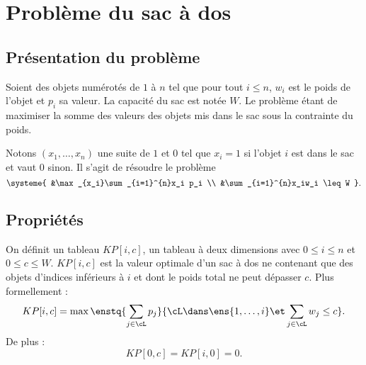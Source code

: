 \documentclass{mybourbaki}
\begin{document}
\section{Problème du sac à dos}

\subsection{Présentation du problème}

Soient des objets numérotés de $1$ à $n$ tel que pour tout $i\leq n$, $w_i$ est le poids de l'objet et $p_i$ sa valeur. La capacité du sac est notée $W$. Le problème étant de maximiser la somme des valeurs des objets mis dans le sac sous la contrainte du poids.

Notons $(x_1,\ldots,x_n)$ une suite de $1$ et $0$ tel que $x_i = 1$ si l'objet $i$ est dans le sac et vaut $0$ sinon. Il s'agit de résoudre le problème \[\systeme{ &\max_{x_i}\sum_{i=1}^{n}x_i p_i \\  &\sum_{i=1}^{n}x_iw_i \leq W }. \]

\subsection{Propriétés}

On définit un tableau $KP[i,c]$, un tableau à deux dimensions avec $0\leq i \leq n$ et $0\leq c\leq W$. $KP[i,c]$ est la valeur optimale d'un sac à dos ne contenant que des objets d'indices inférieurs à $i$ et dont le poids total ne peut dépasser $c$. Plus formellement : \[ KP[i,c] = \max\enstq{\sum_{j\in \cL}p_j}{\cL\dans\ens{1,\ldots,i}\et\sum_{j\in\cL}w_j \leq c}.\] De plus : \[KP[0,c] = KP[i,0] = 0. \]

\end{document}
